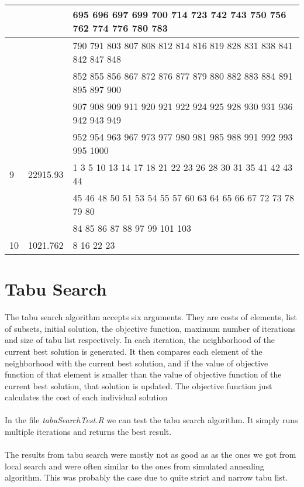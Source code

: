 \documentclass{article}
\begin{document}
\begin{center}
\begin{tabular}{ |l|l|l| }
				& & 695 696 697 699 700 714 723 742 743 750 756 762 774 776 780 783 \\ \hline
				& & 790 791 803 807 808 812 814 816 819 828 831 838 841 842 847 848 \\ \hline
				& & 852 855 856 867 872 876 877 879 880 882 883 884 891 895 897 900 \\ \hline
				& & 907 908 909 911 920 921 922	924 925 928 930 931 936 942 943 949 \\ \hline
				& & 952 954 963 967 973 977 980 981 985 988 991 992 993 995 1000 \\ \hline
				9 & 22915.93 & 1 3 5 10 13 14 17 18 21 22 23 26 28 30 31 35 41 42 43 44 \\ \hline
				& & 45 46 48 50 51 53 54 55 57 60 63 64 65 66 67 72 73 78 79 80 \\ \hline
				& & 84 85 86 87 88 97 99 101 103 \\ \hline
				10 & 1021.762 & 8 16 22 23 \\ \hline		
			\end{tabular}
		\end{center}
		
	\section*{Tabu Search}
	
		The tabu search algorithm accepts six arguments. They are costs of elements, list of subsets, initial solution, the objective function, maximum number of iterations and size of tabu list respectively. In each iteration, the neighborhood of the current best solution is generated. It then compares each element of the neighborhood with the current best solution, and if the value of objective function of that element is smaller than the value of objective function of the current best solution, that solution is updated. The objective function just calculates the cost of each individual solution
		\\ \\
		In the file \textit{tabuSearchTest.R} we can test the tabu search algorithm. It simply runs multiple iterations and returns the best result.
		\\ \\
		The results from tabu search were mostly not as good as as the ones we got from local search and were often similar to the ones from simulated annealing algorithm. This was probably the case due to quite strict and narrow tabu list.
		\\
	
\end{document}
